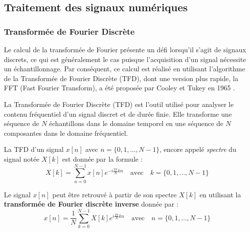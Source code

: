 
\subsection{Traitement des signaux numériques}
\subsubsection{Transformée de Fourier Discrète}{}
Le calcul de la transformée de Fourier présente un défi lorsqu'il s'agit de signaux discrets, ce qui est généralement le cas puisque l'acquisition d'un signal nécessite un échantillonnage. Par conséquent, ce calcul est réalisé en utilisant l'algorithme de la Transformée de Fourier Discrète (TFD), dont une version plus rapide, la FFT (Fast Fourier Transform), a été proposée par Cooley et Tukey en 1965 \cite{cooley1965algorithm}.

La Transformée de Fourier Discrète (TFD) est l'outil utilisé pour analyser le contenu fréquentiel d'un signal discret et de durée finie. Elle transforme une séquence de $N$ échantillons dans le domaine temporel en une séquence de $N$ composantes dans le domaine fréquentiel.

La TFD d'un signal $x[n]$ avec $n=\{0,1,\ldots,N-1\}$, encore appelé \textit{spectre} du signal notée $X[k]$ est donnée par la formule :
\begin{equation}
    X[k] = \sum_{n=0}^{N-1} x[n] e^{-i \frac{2\pi}{N} kn} \quad \text{avec} \quad k=\{0,1,\ldots,N-1\}
\end{equation}

Le signal $x[n]$ peut être retrouvé à partir de son spectre $X[k]$ en utilisant la \textbf{transformée de Fourier discrète inverse} donnée par :
\begin{equation}
    x[n] = \frac{1}{N} \sum_{k=0}^{N-1} X[k] e^{i \frac{2\pi}{N} kn} \quad \text{avec} \quad n=\{0,1,\ldots,N-1\}
\end{equation}



